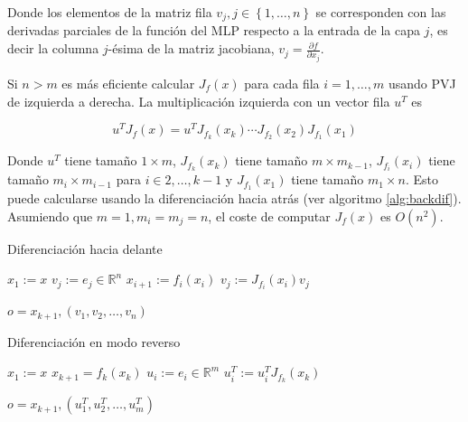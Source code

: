 Donde los elementos de la matriz fila $v_j, j \in \left \{1,\ldots,n \right \}$ se corresponden con las derivadas parciales de la función del MLP respecto a la entrada de la capa $j$, es decir la columna $j$-ésima de la matriz jacobiana, $v_j=\frac{\partial f}{\partial x_j}$. 

Si $n>m$ es más eficiente calcular $J_f(x)$ para cada fila $i=1,\ldots,m$ usando PVJ de izquierda a derecha. La multiplicación izquierda con un vector fila $u^T$ es 

$$u^TJ_f(x)=u^TJ_{f_k}(x_k) \cdots J_{f_2}(x_2) J_{f_1}(x_1)$$

Donde $u^T$ tiene tamaño $1 \times m$,  $J_{f_k}(x_k)$ tiene tamaño $m \times m_{k-1}$, $J_{f_i}(x_i)$ tiene tamaño $m_i \times m_{i-1}$ para $i \in {2,\ldots,k-1}$ y $J_{f_1}(x_1)$ tiene tamaño $m_1 \times n$. Esto puede calcularse usando la diferenciación hacia atrás (ver algoritmo \ref{alg:backdif}). Asumiendo que $m=1, m_i=m_j=n$, el coste de computar $J_f(x)$ es $O(n^2)$.

 
\begin{algorithm}[H]
\caption{Diferenciación hacia delante}
\label{alg:fowdiff}
    \begin{algorithmic}
        \State $x_1 := x$
            \State $v_j := e_j \in \mathbb{R}^n$
        \EndFor
            \State $x_{i+1}:=f_i(x_i)$
                \State $v_j:= J_{f_i}(x_i)v_j$
            \EndFor
        \EndFor 

        
         \Return $o=x_{k+1}, \left (v_1, v_2, \ldots, v_n \right )$
        
    \end{algorithmic}
\end{algorithm}


\begin{algorithm}
\caption{Diferenciación en modo reverso}
\label{alg:backdif}
    \begin{algorithmic}
        \State $x_1:=x$
            \State $x_{k+1} = f_k(x_k)$
        \EndFor
            \State $u_i:=e_i \in \mathbb{R}^m$
        \EndFor 
                \State $u_i^T:= u_i^T J_{f_k}(x_k)$
            \EndFor
        \EndFor 

        \Return $o=x_{k+1}, \left ( u_1^T, u_2^T, \ldots, u_m^T \right )$
    \end{algorithmic}
\end{algorithm}

